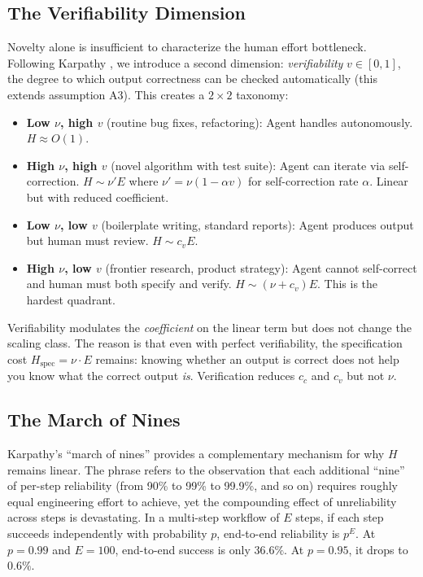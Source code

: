 \documentclass[11pt,a4paper]{article}
\begin{document}
\subsection{The Verifiability Dimension}
\label{sec:verifiability}

Novelty alone is insufficient to characterize the human effort bottleneck. Following Karpathy \citep{karpathy2025verify}, we introduce a second dimension: \emph{verifiability} $v \in [0,1]$, the degree to which output correctness can be checked automatically (this extends assumption A3). This creates a $2 \times 2$ taxonomy:

\begin{itemize}
\item \textbf{Low $\nu$, high $v$} (routine bug fixes, refactoring): Agent handles autonomously. $H \approx O(1)$.
\item \textbf{High $\nu$, high $v$} (novel algorithm with test suite): Agent can iterate via self-correction. $H \sim \nu' E$ where $\nu' = \nu(1-\alpha v)$ for self-correction rate $\alpha$. Linear but with reduced coefficient.
\item \textbf{Low $\nu$, low $v$} (boilerplate writing, standard reports): Agent produces output but human must review. $H \sim c_v E$.
\item \textbf{High $\nu$, low $v$} (frontier research, product strategy): Agent cannot self-correct and human must both specify and verify. $H \sim (\nu + c_v)E$. This is the hardest quadrant.
\end{itemize}

Verifiability modulates the \emph{coefficient} on the linear term but does not change the scaling class. The reason is that even with perfect verifiability, the specification cost $H_{\text{spec}} = \nu \cdot E$ remains: knowing whether an output is correct does not help you know what the correct output \emph{is}. Verification reduces $c_c$ and $c_v$ but not $\nu$.

\subsection{The March of Nines}

Karpathy's ``march of nines'' \citep{karpathy2025verify} provides a complementary mechanism for why $H$ remains linear. The phrase refers to the observation that each additional ``nine'' of per-step reliability (from 90\% to 99\% to 99.9\%, and so on) requires roughly equal engineering effort to achieve, yet the compounding effect of unreliability across steps is devastating. In a multi-step workflow of $E$ steps, if each step succeeds independently with probability $p$, end-to-end reliability is $p^E$. At $p = 0.99$ and $E = 100$, end-to-end success is only $36.6\%$. At $p = 0.95$, it drops to $0.6\%$.
\end{document}
